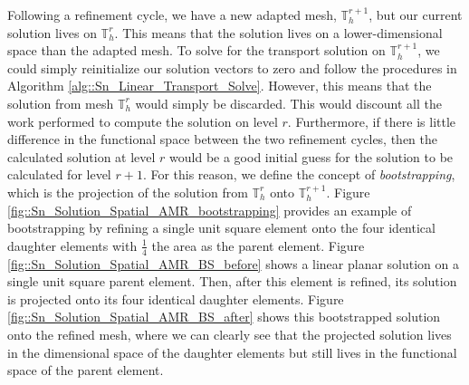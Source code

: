 Following a refinement cycle, we have a new adapted mesh, $\mathbb{T}_h^{r+1}$, but our current solution lives on $\mathbb{T}_h^{r}$. This means that the solution lives on a lower-dimensional space than the adapted mesh. To solve for the transport solution on $\mathbb{T}_h^{r+1}$, we could simply reinitialize our solution vectors to zero and follow the procedures in Algorithm \ref{alg::Sn_Linear_Transport_Solve}. However, this means that the solution from mesh $\mathbb{T}_h^{r}$ would simply be discarded. This would discount all the work performed to compute the solution on level $r$. Furthermore, if there is little difference in the functional space between the two refinement cycles, then the calculated solution at level $r$ would be a good initial guess for the solution to be calculated for level $r+1$. For this reason, we define the concept of {\em bootstrapping}, which is the projection of the solution from $\mathbb{T}_h^{r}$ onto $\mathbb{T}_h^{r+1}$. Figure \ref{fig::Sn_Solution_Spatial_AMR_bootstrapping} provides an example of bootstrapping by refining a single unit square element onto the four identical daughter elements with $\frac{1}{4}$ the area as the parent element. Figure \ref{fig::Sn_Solution_Spatial_AMR_BS_before} shows a linear planar solution on a single unit square parent element. Then, after this element is refined, its solution is projected onto its four identical daughter elements. Figure \ref{fig::Sn_Solution_Spatial_AMR_BS_after} shows this bootstrapped solution onto the refined mesh, where we can clearly see that the projected solution lives in the dimensional space of the daughter elements but still lives in the functional space of the parent element.

